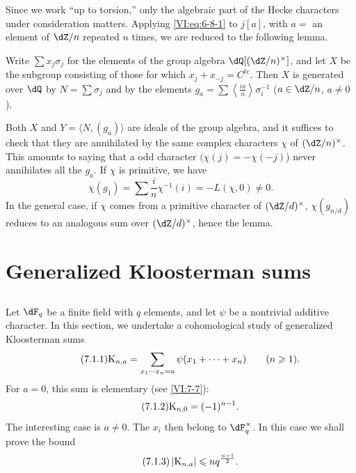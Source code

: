 Since we work ``up to torsion,'' only the algebraic part of the 
Hecke characters under consideration matters. Applying \eqref{VI:eq:6-8-1} to 
$j[a]$, with $a=$ an element of $\dZ/n$ repeated $n$ times, we 
are reduced to the following lemma.





\begin{lemma_}\label{VI:6-12}
Write $\sum x_j \sigma_j$ for the elements of the group algebra 
  $\dQ[(\dZ/n)^\times]$, and let $X$ be the subgroup consisting of those for which 
$x_j+x_{-j}=C^{\underline{t e}}$. Then $X$ is generated over $\dQ$ by 
$N=\sum \sigma_j$ and by the elements 
  $g_a=\sum \left\langle \frac{i a}{n}\right\rangle \sigma_i^{-1}$ 
($a\in \dZ/n$, $a\ne 0$). 
\end{lemma_}

Both $X$ and $Y=\langle N,(g_a)\rangle$ are ideals of the group 
algebra, and it suffices to check that they are annihilated by the same 
complex characters $\chi$ of $(\dZ/n)^\times$. This amounts to saying that a 
odd character $(\chi(j)=-\chi(-j)$) never annihilates all the $g_a$. If 
$\chi$ is primitive, we have 
\[
  \chi(g_1) = \sum \frac i n \chi^{-1}(i) = -L(\chi,0)\ne 0 \text{.} 
\]
In the general case, if $\chi$ comes from a primitive character of 
  $(\dZ/d)^\times$, $\chi(g_{n/d})$ reduces to an analogous sum over 
  $(\dZ/d)^\times$, hence the lemma. 










\section{Generalized Kloosterman sums}\label{VI:7}





\subsection{}\label{VI:7-1}

Let $\dF_q$ be a finite field with $q$ elements, and let $\psi$ be a nontrivial 
additive character. In this section, we undertake a cohomological study of 
generalized Kloosterman sums 
\begin{equation*}\tag{7.1.1}\label{VI:eq:7-1-1}
  \textnormal{K}_{n,a} = \sum_{x_1\dotsm x_n = a} \psi(x_1+\cdots + x_n) \qquad (n\geqslant 1) \text{.} 
\end{equation*}
For $a=0$, this sum is elementary (see \ref{VI:7-7}): 
\begin{equation*}\tag{7.1.2}\label{VI:eq:7-1-2}
  \textnormal{K}_{n,0} = (-1)^{n-1} \text{.} 
\end{equation*}
The interesting case is $a\ne 0$. The $x_i$ then belong to 
$\dF_q^\times$. In this case we shall prove the bound 
\begin{equation*}\tag{7.1.3}\label{VI:eq:7-1-3}
  \left|\textnormal{K}_{n,a}\right| \leqslant n q^{\frac{n-1}{2}} \text{.} 
\end{equation*}


